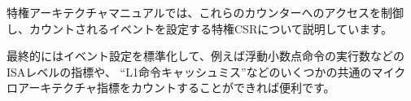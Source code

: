 \begin{commentary}
\begin{comment}
  The privileged architecture manual describes the privileged CSRs
  controlling access to these counters and to set the events to be
  counted.
\end{comment}
特権アーキテクチャマニュアルでは、これらのカウンターへのアクセスを制御し、カウントされるイベントを設定する特権CSRについて説明しています。

\begin{comment}
  It would be useful to eventually standardize event settings to count
  ISA-level metrics, such as the number of floating-point instructions
  executed for example, and possibly a few common microarchitectural
  metrics, such as ``L1 instruction cache misses''.
\end{comment}

最終的にはイベント設定を標準化して、例えば浮動小数点命令の実行数などのISAレベルの指標や、
``L1命令キャッシュミス''などのいくつかの共通のマイクロアーキテクチャ指標をカウントすることができれば便利です。

\end{commentary}
